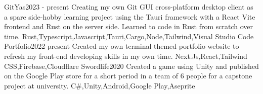 %
%
%


\begin{projects}
	\project
	{GitYas}{2023 - present}
    {}
	{Creating my own Git GUI cross-platform desktop client as a spare side-hobby learning project using the Tauri framework with a React Vite frontend and Rust on the server side. Learned to code in Rust from scratch over time.}
	{Rust,Typescript,Javascript,Tauri,Cargo,Node,Tailwind,Visual Studio Code}
    \project
	{Portfolio}{2022-present}
	{}
	{Created my own terminal themed portfolio website to refresh my front-end developing skills in my own time.}
	{Next.Js,React,Tailwind CSS,Firebase,Cloudflare}
	\project
	{Swordlife}{2020}
	{}
	{Created a game using Unity and published on the Google Play store for a short period in a team of 6 people for a capstone project at university.}
	{C\#,Unity,Android,Google Play,Aseprite}

\end{projects}